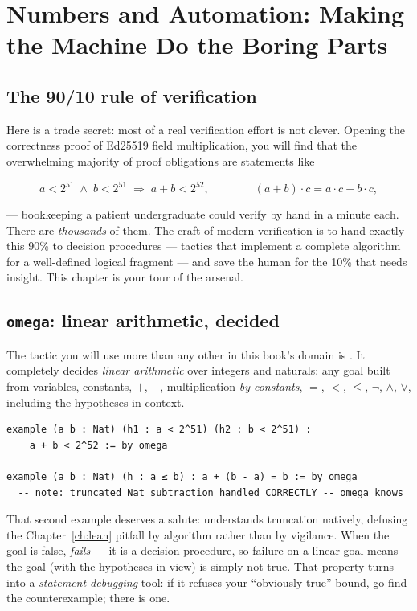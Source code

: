 \chapter{Numbers and Automation: Making the Machine Do the Boring Parts}
\label{ch:automation}

\section{The 90/10 rule of verification}

Here is a trade secret: most of a real verification effort is not clever.
Opening the correctness proof of Ed25519 field multiplication, you will find
that the overwhelming majority of proof obligations are statements like

\[
a < 2^{51} \;\wedge\; b < 2^{51} \;\Longrightarrow\; a + b < 2^{52},
\qquad\qquad
(a + b) \cdot c = a\cdot c + b\cdot c,
\]

--- bookkeeping a patient undergraduate could verify by hand in a minute
each. There are \emph{thousands} of them. The craft of modern verification is
to hand exactly this 90\% to decision procedures --- tactics that implement a
complete algorithm for a well-defined logical fragment --- and save the human
for the 10\% that needs insight. This chapter is your tour of the arsenal.

\section{\texttt{omega}: linear arithmetic, decided}

The tactic you will use more than any other in this book's domain is
. It completely decides \emph{linear arithmetic} over integers
and naturals: any goal built from variables, constants, $+$, $-$,
multiplication \emph{by constants}, $=$, $<$, $\le$, $\lnot$, $\wedge$,
$\vee$, including the hypotheses in context.

\begin{lstlisting}[language=Lean]
example (a b : Nat) (h1 : a < 2^51) (h2 : b < 2^51) :
    a + b < 2^52 := by omega

example (a b : Nat) (h : a ≤ b) : a + (b - a) = b := by omega
  -- note: truncated Nat subtraction handled CORRECTLY -- omega knows
\end{lstlisting}

That second example deserves a salute:  understands 
truncation natively, defusing the Chapter~\ref{ch:lean} pitfall by algorithm
rather than by vigilance. When the goal is false,  \emph{fails} ---
it is a decision procedure, so failure on a linear goal means the goal (with
the hypotheses in view) is simply not true. That property turns 
into a \emph{statement-debugging} tool: if it refuses your ``obviously true''
bound, go find the counterexample; there is one.

